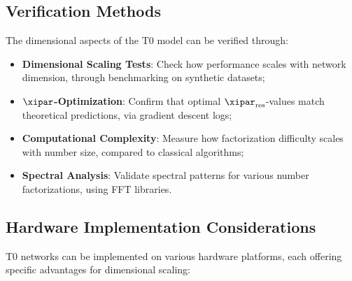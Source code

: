 	\subsection{Verification Methods}
	\label{subsec:verification_methods}
	
	The dimensional aspects of the T0 model can be verified through:
	
	\begin{itemize}
		\item \textbf{Dimensional Scaling Tests}: Check how performance scales with network dimension, through benchmarking on synthetic datasets;
		\item \textbf{$\xipar$-Optimization}: Confirm that optimal $\xipar_{\text{res}}$-values match theoretical predictions, via gradient descent logs;
		\item \textbf{Computational Complexity}: Measure how factorization difficulty scales with number size, compared to classical algorithms;
		\item \textbf{Spectral Analysis}: Validate spectral patterns for various number factorizations, using FFT libraries.
	\end{itemize}
	
	\subsection{Hardware Implementation Considerations}
	\label{subsec:hardware_implementation}
	
	T0 networks can be implemented on various hardware platforms, each offering specific advantages for dimensional scaling:
	
